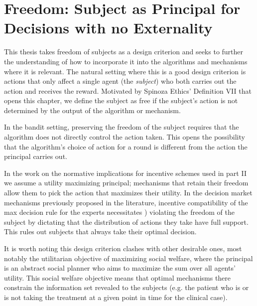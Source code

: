 \section{Freedom: Subject as Principal for Decisions with no Externality}

This thesis takes freedom of subjects as a design criterion and seeks to further the understanding of how to incorporate it into the  algorithms and mechanisms where it is relevant.
The natural setting where this is a good design criterion is actions that only affect a single agent (the \emph{subject}) who both carries out the action and receives the reward.
Motivated by Spinoza Ethics' Definition VII that opens this chapter, we define the subject as free if the subject's action is not determined by the output of the algorithm or mechanism.

In the bandit setting, preserving the freedom of the subject requires that the algorithm does not directly control the action taken.
This opens the possibility that the algorithm's choice of action for a round is different from the action the principal carries out.

In the work on the normative implications for incentive schemes used in part II we assume a utility maximizing principal; mechanisms that retain their freedom allow them to pick the action that maximizes their utility.
In the decision market mechanisms previously proposed in the literature, incentive compatibility of the max decision rule for the experts necessitates \citep{othman2010decision,chen2014eliciting}) violating the freedom of the subject by dictating that the distribution of actions they take have full support. This rules out subjects that always take their optimal decision.


It is worth noting this design criterion clashes with other desirable ones, most notably the utilitarian objective of maximizing social welfare, where the principal is an abstract social planner who aims to maximize the sum over all agents' utility. This social welfare objective means that optimal mechanisms there \citep{kremer2014implementing,mansour2015bayesian,mansour2016bayesian} constrain the information set revealed to the subjects (e.g. the patient who is or is not taking the treatment at a given point in time for the clinical case).







